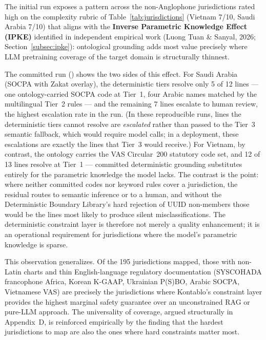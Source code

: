 The initial run exposes a pattern across the non-Anglophone jurisdictions
rated high on the complexity rubric of Table~\ref{tab:jurisdictions}
(Vietnam 7/10, Saudi Arabia 7/10) that aligns with the \textbf{Inverse
Parametric Knowledge Effect (IPKE)} identified in independent empirical work
(Luong Tuan \& Sanyal, 2026; Section~\ref{subsec:ipke}): ontological grounding
adds most value precisely where LLM pretraining coverage of the target domain
is structurally thinnest.

The committed run ()
shows the two sides of this effect. For Saudi Arabia (SOCPA with Zakat
overlay), the deterministic tiers resolve only 5 of 12 lines --- one
ontology-carried SOCPA code at Tier~1, four Arabic names matched by the
multilingual Tier~2 rules --- and the remaining 7 lines escalate to human
review, the highest escalation rate in the run. (In these reproducible runs,
lines the deterministic tiers cannot resolve are \emph{escalated} rather than
passed to the Tier~3 semantic fallback, which would require model calls; in a
deployment, these escalations are exactly the lines that Tier~3 would
receive.) For Vietnam, by contrast, the ontology carries the VAS Circular~200
statutory code set, and 12 of 13 lines resolve at Tier~1 --- committed
deterministic grounding substitutes entirely for the parametric knowledge the
model lacks. The contrast is the point: where neither committed codes nor
keyword rules cover a jurisdiction, the residual routes to semantic inference
or to a human, and without the Deterministic Boundary Library's hard rejection
of UUID non-members those would be the lines most likely to produce silent
misclassifications. The deterministic constraint layer is therefore not
merely a quality enhancement; it is an operational requirement for
jurisdictions where the model's parametric knowledge is sparse.

This observation generalizes. Of the 195 jurisdictions mapped, those with
non-Latin charts and thin English-language regulatory documentation
(SYSCOHADA francophone Africa, Korean K-GAAP, Ukrainian P(S)BO, Arabic SOCPA,
Vietnamese VAS) are precisely the jurisdictions where Kontablo's constraint
layer provides the highest marginal safety guarantee over an unconstrained RAG
or pure-LLM approach. The universality of coverage, argued structurally in
Appendix~D, is reinforced empirically by the finding that the hardest
jurisdictions to map are also the ones where hard constraints matter most.
